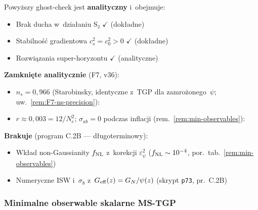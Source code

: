 \begin{remark}\label{rem:C2A-status}
Powy\.zszy ghost-check jest \textbf{analityczny} i~obejmuje:
\begin{itemize}[nosep]
  \item Brak ducha w~dzia\l{}aniu S₂ $\checkmark$ (dok\l{}adne)
  \item Stabilno\'s\'c gradientowa $c_s^2 = c_0^2 > 0$ $\checkmark$ (dok\l{}adne)
  \item Rozwiązania super-horyzontu $\checkmark$ (analityczne)
\end{itemize}
\textbf{Zamkni\k{e}te analitycznie} (F7, v36):
\begin{itemize}[nosep]
  \item $n_s = 0{,}966$ (Starobinsky, identyczne z~TGP dla zamro\.zonego~$\psi$;
    uw.~\ref{rem:F7-ns-precision}): \checkmark
  \item $r \approx 0{,}003 = 12/N_e^2$; $\sigma_{ab}=0$ podczas inflacji
    (rem.~\ref{rem:min-observables}): \checkmark
\end{itemize}
\textbf{Brakuje} (program C.2B --- d\l{}ugoterminowy):
\begin{itemize}[nosep]
  \item Wk\l{}ad non-Gaussianity $f_{\rm NL}$ z~korekcji $\varepsilon_\psi^2$
    ($f_{\rm NL} \sim 10^{-4}$, por.\ tab.\ \ref{rem:min-observables})
  \item Numeryczne ISW i~$\sigma_8$ z~$G_{\rm eff}(z) = G_N/\psi(z)$
    (skrypt \texttt{p73}, pr.\ C.2B)
\end{itemize}
\end{remark}

\subsubsection{Minimalne obserwable skalarne MS-TGP}\label{sssec:min-observables}

